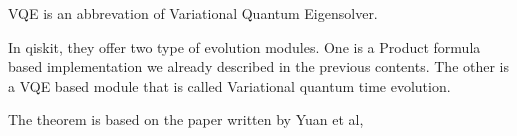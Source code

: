 VQE is an abbrevation of Variational Quantum Eigensolver.

In qiskit, they offer two type of evolution modules. 
One is a Product formula based implementation we already described in the previous contents.
The other is a VQE based module that is called Variational quantum time evolution.

The theorem is based on the paper written by Yuan et al\cite{yuan_theory_2019}, 